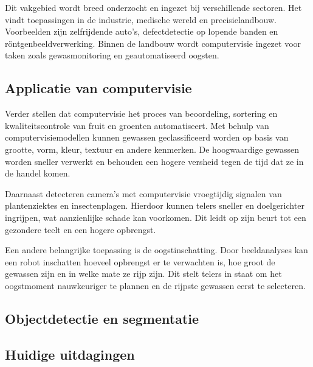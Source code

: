 Dit vakgebied wordt breed onderzocht en ingezet bij verschillende sectoren. Het vindt toepassingen in de industrie, medische wereld en precisielandbouw. Voorbeelden zijn zelfrijdende auto’s, defectdetectie op lopende banden en röntgenbeeldverwerking. Binnen de landbouw wordt computervisie ingezet voor taken zoals gewasmonitoring en geautomatiseerd oogsten.

\subsection{Applicatie van computervisie}
Verder stellen \textcite{Radojcic2023} dat computervisie het proces van beoordeling, sortering en kwaliteitscontrole van fruit en groenten automatiseert. Met behulp van computervisiemodellen kunnen gewassen geclassificeerd worden op basis van grootte, vorm, kleur, textuur en andere kenmerken. De hoogwaardige gewassen worden sneller verwerkt en behouden een hogere versheid tegen de tijd dat ze in de handel komen.

Daarnaast detecteren camera’s met computervisie vroegtijdig signalen van plantenziektes en insectenplagen. Hierdoor kunnen telers sneller en doelgerichter ingrijpen, wat aanzienlijke schade kan voorkomen. Dit leidt op zijn beurt tot een gezondere teelt en een hogere opbrengst.

Een andere belangrijke toepassing is de oogstinschatting. Door beeldanalyses kan een robot inschatten hoeveel opbrengst er te verwachten is, hoe groot de gewassen zijn en in welke mate ze rijp zijn. Dit stelt telers in staat om het oogstmoment nauwkeuriger te plannen en de rijpste gewassen eerst te selecteren.

\subsection{Objectdetectie en segmentatie}


\subsection{Huidige uitdagingen}







